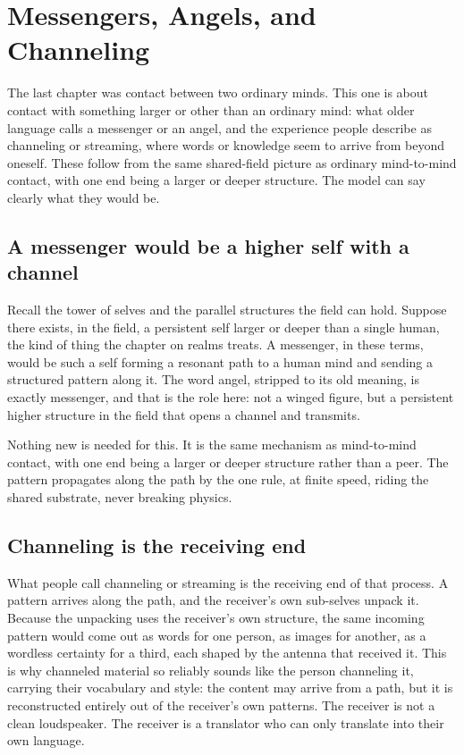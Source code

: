 \section{Messengers, Angels, and Channeling}

The last chapter was contact between two ordinary minds. This one is about contact with something larger or other than an ordinary mind: what older language calls a messenger or an angel, and the experience people describe as channeling or streaming, where words or knowledge seem to arrive from beyond oneself. These follow from the same shared-field picture as ordinary mind-to-mind contact, with one end being a larger or deeper structure. The model can say clearly what they would be.

\subsection{A messenger would be a higher self with a channel}

Recall the tower of selves and the parallel structures the field can hold. Suppose there exists, in the field, a persistent self larger or deeper than a single human, the kind of thing the chapter on realms treats. A messenger, in these terms, would be such a self forming a resonant path to a human mind and sending a structured pattern along it. The word angel, stripped to its old meaning, is exactly messenger, and that is the role here: not a winged figure, but a persistent higher structure in the field that opens a channel and transmits.

Nothing new is needed for this. It is the same mechanism as mind-to-mind contact, with one end being a larger or deeper structure rather than a peer. The pattern propagates along the path by the one rule, at finite speed, riding the shared substrate, never breaking physics.

\subsection{Channeling is the receiving end}

What people call channeling or streaming is the receiving end of that process. A pattern arrives along the path, and the receiver's own sub-selves unpack it. Because the unpacking uses the receiver's own structure, the same incoming pattern would come out as words for one person, as images for another, as a wordless certainty for a third, each shaped by the antenna that received it. This is why channeled material so reliably sounds like the person channeling it, carrying their vocabulary and style: the content may arrive from a path, but it is reconstructed entirely out of the receiver's own patterns. The receiver is not a clean loudspeaker. The receiver is a translator who can only translate into their own language.

